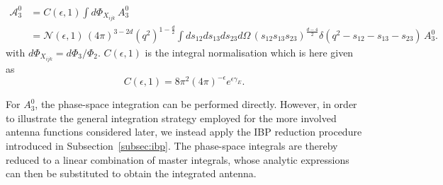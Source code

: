 \begin{equation}
    \begin{split}
        \mathcal A_3^0 &= C(\epsilon,1)\int d\Phi_{X_{ijk}}\,A_3^0\\
                       &= \mathcal N(\epsilon,1)\,(4\pi)^{3-2d}\left(q^2\right)^{1-\frac d2}\int ds_{12}ds_{13}ds_{23}d\Omega\,(s_{12}s_{13}s_{23})^{\frac{d-4}{2}}\delta\left(q^2-s_{12}-s_{13}-s_{23}\right)\,A_3^0.
    \end{split}
\end{equation}
with $d\Phi_{X_{ijk}} = d\Phi_3/\Phi_2$.
$C(\epsilon,1)$ is the integral normalisation which is here given as 
\begin{equation}
    C(\epsilon,1) = 8\pi^2(4\pi)^{-\epsilon}e^{\epsilon\gamma_E}.
\end{equation}

For $A_3^0$, the phase-space integration can be performed directly. However, in order to illustrate
the general integration strategy employed for the more involved antenna functions considered later,
we instead apply the IBP reduction procedure introduced in Subsection~\ref{subsec:ibp}. The
phase-space integrals are thereby reduced to a linear combination of master integrals, whose analytic
expressions can then be substituted to obtain the integrated antenna.

